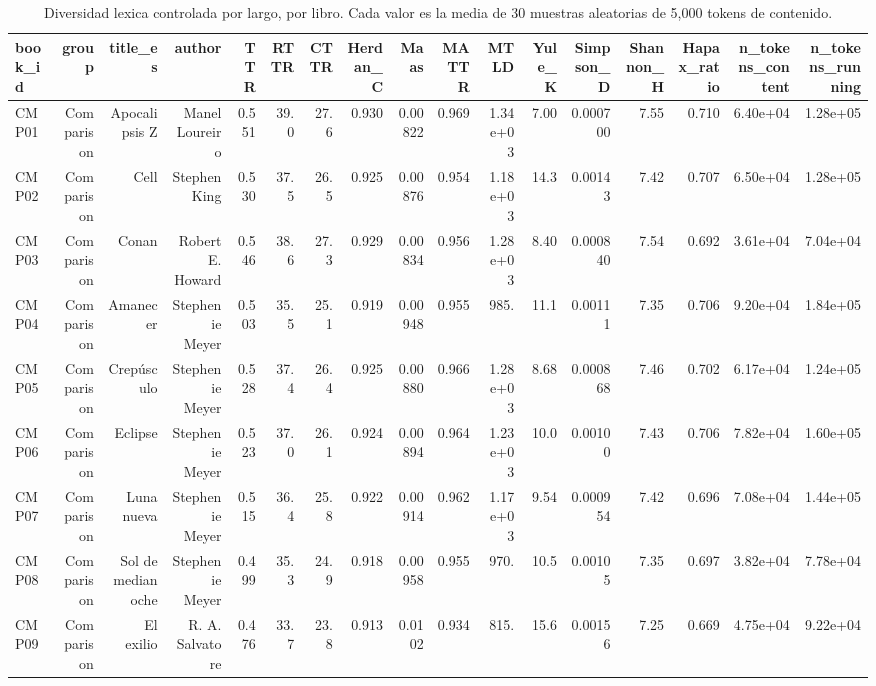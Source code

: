 \begin{table}[htbp]
\centering
\small
\caption{Diversidad lexica controlada por largo, por libro. Cada valor es la media de 30 muestras aleatorias de 5,000 tokens de contenido.}
\label{tab:lexical-by-book-es}
\begin{tabular}{lrrrrrrrrrrrrrrrr}
\toprule
\textbf{book\_id} & \textbf{group} & \textbf{title\_es} & \textbf{author} & \textbf{TTR} & \textbf{RTTR} & \textbf{CTTR} & \textbf{Herdan\_C} & \textbf{Maas} & \textbf{MATTR} & \textbf{MTLD} & \textbf{Yule\_K} & \textbf{Simpson\_D} & \textbf{Shannon\_H} & \textbf{Hapax\_ratio} & \textbf{n\_tokens\_content} & \textbf{n\_tokens\_running} \\
\midrule
CMP01 & Comparison & Apocalipsis Z & Manel Loureiro & 0.551 & 39.0 & 27.6 & 0.930 & 0.00822 & 0.969 & 1.34e+03 & 7.00 & 0.000700 & 7.55 & 0.710 & 6.40e+04 & 1.28e+05 \\
CMP02 & Comparison & Cell & Stephen King & 0.530 & 37.5 & 26.5 & 0.925 & 0.00876 & 0.954 & 1.18e+03 & 14.3 & 0.00143 & 7.42 & 0.707 & 6.50e+04 & 1.28e+05 \\
CMP03 & Comparison & Conan & Robert E. Howard & 0.546 & 38.6 & 27.3 & 0.929 & 0.00834 & 0.956 & 1.28e+03 & 8.40 & 0.000840 & 7.54 & 0.692 & 3.61e+04 & 7.04e+04 \\
CMP04 & Comparison & Amanecer & Stephenie Meyer & 0.503 & 35.5 & 25.1 & 0.919 & 0.00948 & 0.955 & 985. & 11.1 & 0.00111 & 7.35 & 0.706 & 9.20e+04 & 1.84e+05 \\
CMP05 & Comparison & Crepúsculo & Stephenie Meyer & 0.528 & 37.4 & 26.4 & 0.925 & 0.00880 & 0.966 & 1.28e+03 & 8.68 & 0.000868 & 7.46 & 0.702 & 6.17e+04 & 1.24e+05 \\
CMP06 & Comparison & Eclipse & Stephenie Meyer & 0.523 & 37.0 & 26.1 & 0.924 & 0.00894 & 0.964 & 1.23e+03 & 10.0 & 0.00100 & 7.43 & 0.706 & 7.82e+04 & 1.60e+05 \\
CMP07 & Comparison & Luna nueva & Stephenie Meyer & 0.515 & 36.4 & 25.8 & 0.922 & 0.00914 & 0.962 & 1.17e+03 & 9.54 & 0.000954 & 7.42 & 0.696 & 7.08e+04 & 1.44e+05 \\
CMP08 & Comparison & Sol de medianoche & Stephenie Meyer & 0.499 & 35.3 & 24.9 & 0.918 & 0.00958 & 0.955 & 970. & 10.5 & 0.00105 & 7.35 & 0.697 & 3.82e+04 & 7.78e+04 \\
CMP09 & Comparison & El exilio & R. A. Salvatore & 0.476 & 33.7 & 23.8 & 0.913 & 0.0102 & 0.934 & 815. & 15.6 & 0.00156 & 7.25 & 0.669 & 4.75e+04 & 9.22e+04 \\

\end{tabular}
\end{table}
